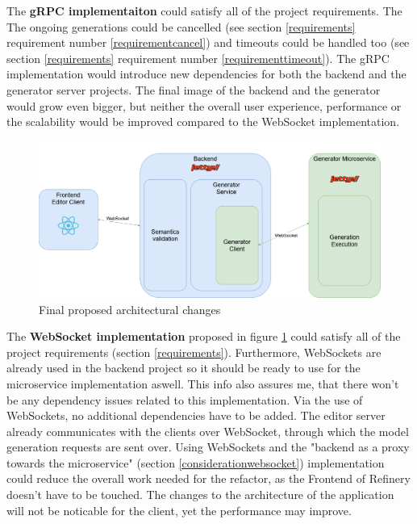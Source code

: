 	The \textbf{gRPC implementaiton} could satisfy all of the project requirements. The The ongoing generations could be cancelled (see section \ref{requirements} 
	requirement number \ref{requirementcancel}) and timeouts could 
	be handled too (see section \ref{requirements} 
	requirement number \ref{requirementtimeout}). 
	The gRPC implementation would introduce new dependencies for both the backend and the generator server projects.
	The final image of the backend and the generator would grow even bigger, but neither the overall user experience, performance
	or the scalability would be improved compared to the WebSocket implementation. 

	\begin{figure}[h!]
		\begin{center}
			\includegraphics[scale=0.3]{include/imgs/arch_plan.png}
			\caption{Final proposed architectural changes}
			\label{archplan}
		\end{center}
	\end{figure}

	The \textbf{WebSocket implementation} proposed in figure \ref{archplan} could satisfy all of the project requirements (section \ref{requirements}). 
	Furthermore, WebSockets are already used 
	in the backend project so it should be ready to use for the microservice implementation aswell.
	This info also assures me, that there won't be any dependency issues related to this implementation. 
	Via the use of 
	WebSockets, no additional dependencies have to be added. The editor server already communicates 
	with the clients over WebSocket, through which
	the model generation requests are sent over. 
	Using WebSockets and the "backend as a proxy towards the microservice" (section \ref{considerationwebsocket}) implementation could 
	reduce the overall work needed for the refactor, 
	as the Frontend of Refinery 
	doesn't have to be touched. 
	The changes to the architecture of the application will not be noticable for the client, yet the performance may improve.

